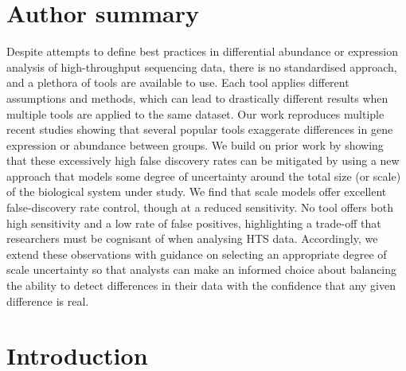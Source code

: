 \documentclass[10pt,letterpaper]{article}
\begin{document}

%
\section*{Author summary}
Despite attempts to define best practices in differential abundance or expression analysis of high-throughput sequencing data, there is no standardised approach, and a plethora of tools are available to use. Each tool applies different assumptions and methods, which can lead to drastically different results when multiple tools are applied to the same dataset. Our work reproduces multiple recent studies showing that several popular tools exaggerate differences in gene expression or abundance between groups. We build on prior work by showing that these excessively high false discovery rates can be mitigated by using a new approach that models some degree of uncertainty around the total size (or scale) of the biological system under study. We find that scale models offer excellent false-discovery rate control, though at a reduced sensitivity. No tool offers both high sensitivity and a low rate of false positives, highlighting a trade-off that researchers must be cognisant of when analysing HTS data. Accordingly, we extend these observations with guidance on selecting an appropriate degree of scale uncertainty so that analysts can make an informed choice about balancing the ability to detect differences in their data with the confidence that any given difference is real.

\linenumbers


\section*{Introduction}
\end{document}
